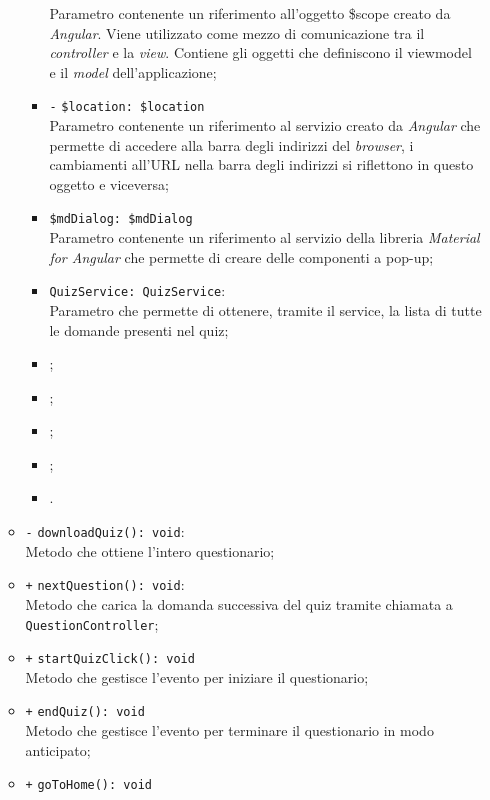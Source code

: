 \begin{itemize}
\begin{itemize}
\begin{itemize}
			Parametro contenente un riferimento all'oggetto \$scope creato da \textit{Angular}. Viene utilizzato come mezzo di comunicazione tra il \textit{controller} e la \textit{view}. Contiene gli oggetti che definiscono il viewmodel e il \textit{model} dell'applicazione;
			\item \texttt{-} \texttt{\$location: \$location} \\
			Parametro contenente un riferimento al servizio creato da \textit{Angular} che permette di accedere alla barra degli indirizzi del \textit{browser}, i cambiamenti all’URL nella barra degli indirizzi si riflettono in questo oggetto e viceversa;
			\item \texttt{\$mdDialog: \$mdDialog} \\
			Parametro contenente un riferimento al servizio della libreria \textit{Material for Angular} che permette di creare delle componenti a pop-up;
			\item \texttt{QuizService: QuizService}:\\ Parametro che permette di ottenere, tramite il service, la lista di tutte le domande presenti nel quiz;
			\item \locationP;
			\item \routeparamsP;
			\item \errorinfomodelP;
			\item \questionnairemodelP;
			\item \timeoutP.
		\end{itemize}
		\item \texttt{-} \texttt{downloadQuiz(): void}: \\ Metodo che ottiene l'intero questionario; \\
		\item \texttt{+} \texttt{nextQuestion(): void}: \\ Metodo che carica la domanda successiva del quiz tramite chiamata a \texttt{QuestionController}; \\
		\item \texttt{+} \texttt{startQuizClick(): void} \\
		Metodo che gestisce l'evento per iniziare il questionario;
		\item \texttt{+} \texttt{endQuiz(): void} \\
		Metodo che gestisce l'evento per terminare il questionario in modo anticipato;
		\item \texttt{+} \texttt{goToHome(): void} \\

\end{itemize}
\end{itemize}
